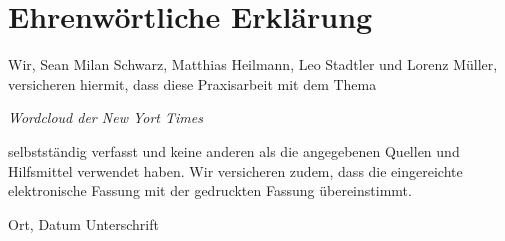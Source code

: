 \chapter*{Ehrenwörtliche Erklärung}
\thispagestyle{plain}

Wir, Sean Milan Schwarz, Matthias Heilmann, Leo Stadtler und Lorenz Müller, versicheren hiermit, dass diese Praxisarbeit mit dem Thema

\textit{Wordcloud der New Yort Times}

selbstständig verfasst und keine anderen als die angegebenen Quellen und Hilfsmittel verwendet haben. Wir versicheren zudem, dass die 
eingereichte elektronische Fassung mit der gedruckten Fassung übereinstimmt.

\vspace{3cm}

Ort, Datum \hfill Unterschrift